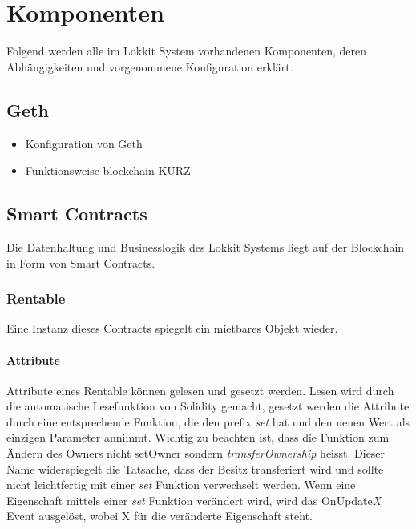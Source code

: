 \section{Komponenten}
\label{sys_sec:Komponenten}
Folgend werden alle im Lokkit System vorhandenen Komponenten, deren Abhängigkeiten und vorgenommene Konfiguration erklärt.

\subsection{Geth}
\label{sys_subsec:Geth}
\begin{itemize}
    \item Konfiguration von Geth
    \item Funktionsweise blockchain KURZ
\end{itemize}

\subsection{Smart Contracts}
Die Datenhaltung und Businesslogik des Lokkit Systems liegt auf der Blockchain in Form von Smart Contracts.
\subsubsection{Rentable}
\label{sys_subsubsec:Rentable}
Eine Instanz dieses Contracts spiegelt ein mietbares Objekt wieder.

\paragraph{Attribute}
\label{sys_para:Rentable_Attribute}
Attribute eines Rentable können gelesen und gesetzt werden. Lesen wird durch die automatische Lesefunktion von Solidity gemacht, gesetzt werden die Attribute durch eine entsprechende Funktion, die den prefix \emph{set} hat und den neuen Wert als einzigen Parameter annimmt. Wichtig zu beachten ist, dass die Funktion zum Ändern des Owners nicht setOwner sondern \emph{transferOwnership} heisst. Dieser Name widerspiegelt die Tatsache, dass der Besitz transferiert wird und sollte nicht leichtfertig mit einer \emph{set} Funktion verwechselt werden. Wenn eine Eigenschaft mittels einer \emph{set} Funktion verändert wird, wird das OnUpdate\emph{X} Event ausgelöst, wobei X für die veränderte Eigenschaft steht. 

